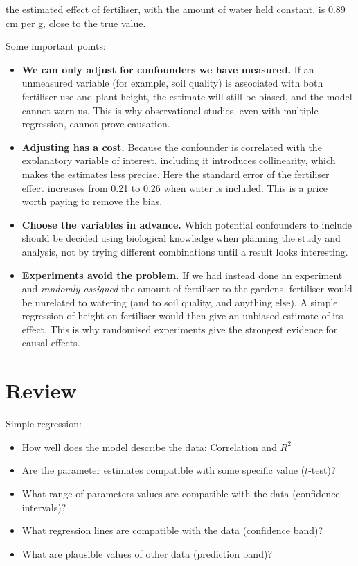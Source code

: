 \documentclass[
  letterpaper,
  8pt,
  a4paper]{book}
\providecommand{\tightlist}{%
  \setlength{\itemsep}{0pt}\setlength{\parskip}{0pt}}
\begin{document}
the estimated effect of fertiliser, with the amount of water held
constant, is 0.89 cm per g, close to the true value.

Some important points:

\begin{itemize}
\tightlist
\item
  \textbf{We can only adjust for confounders we have measured.} If an
  unmeasured variable (for example, soil quality) is associated with
  both fertiliser use and plant height, the estimate will still be
  biased, and the model cannot warn us. This is why observational
  studies, even with multiple regression, cannot prove causation.
\item
  \textbf{Adjusting has a cost.} Because the confounder is correlated
  with the explanatory variable of interest, including it introduces
  collinearity, which makes the estimates less precise. Here the
  standard error of the fertiliser effect increases from 0.21 to 0.26
  when water is included. This is a price worth paying to remove the
  bias.
\item
  \textbf{Choose the variables in advance.} Which potential confounders
  to include should be decided using biological knowledge when planning
  the study and analysis, not by trying different combinations until a
  result looks interesting.
\item
  \textbf{Experiments avoid the problem.} If we had instead done an
  experiment and \emph{randomly assigned} the amount of fertiliser to
  the gardens, fertiliser would be unrelated to watering (and to soil
  quality, and anything else). A simple regression of height on
  fertiliser would then give an unbiased estimate of its effect. This is
  why randomised experiments give the strongest evidence for causal
  effects.
\end{itemize}

\section*{Review}\label{review-4}


Simple regression:

\begin{itemize}
\tightlist
\item
  How well does the model describe the data: Correlation and \(R^2\)
\item
  Are the parameter estimates compatible with some specific value
  (\(t\)-test)?
\item
  What range of parameters values are compatible with the data
  (confidence intervals)?
\item
  What regression lines are compatible with the data (confidence band)?
\item
  What are plausible values of other data (prediction band)?
\end{itemize}
\end{document}
